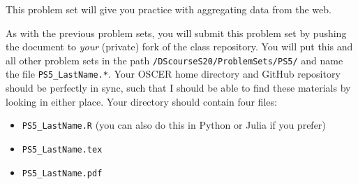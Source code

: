 \documentclass[12pt,english]{exam}
\begin{document}
This problem set will give you practice with aggregating data from the web.

As with the previous problem sets, you will submit this problem set by pushing the document to \emph{your} (private) fork of the class repository. You will put this and all other problem sets in the path \texttt{/DScourseS20/ProblemSets/PS5/} and name the file \texttt{PS5\_LastName.*}. Your OSCER home directory and GitHub repository should be perfectly in sync, such that I should be able to find these materials by looking in either place. Your directory should contain four files:
\begin{itemize}
    \item \texttt{PS5\_LastName.R} (you can also do this in Python or Julia if you prefer)
    \item \texttt{PS5\_LastName.tex}
    \item \texttt{PS5\_LastName.pdf}
\end{itemize}
\end{document}
